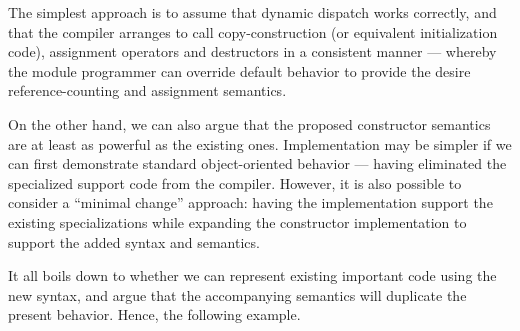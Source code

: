 The simplest approach is to assume that dynamic dispatch works correctly, and
that the compiler arranges to call copy-construction (or equivalent
initialization code), assignment operators and destructors in a consistent
manner --- whereby the module programmer can override default behavior to
provide the desire reference-counting and assignment semantics.

On the other hand, we can also argue that the proposed constructor semantics are
at least as powerful as the existing ones.  Implementation may be simpler if we
can first demonstrate standard object-oriented behavior --- having eliminated
the specialized support code from the compiler.  However, it is also possible to
consider a ``minimal change'' approach: having the implementation support the
existing specializations while expanding the constructor implementation to
support the added syntax and semantics.

It all boils down to whether we can represent existing important code using the
new syntax, and argue that the accompanying semantics will duplicate the present
behavior.  Hence, the following example.

